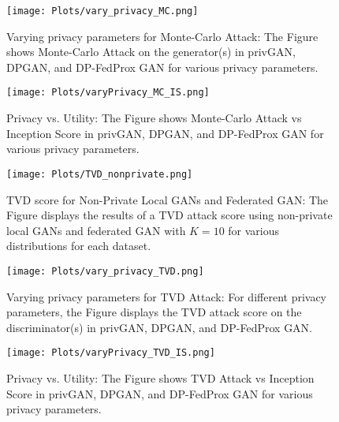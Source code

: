 \begin{figure}
 \centering
 \texttt{[image: Plots/vary\_privacy\_MC.png]}
 \caption{Varying privacy parameters for Monte-Carlo Attack: The Figure shows Monte-Carlo Attack on the generator(s) in privGAN, DPGAN, and DP-FedProx GAN for various privacy parameters. }
 \label{fig:vary_privacy_MC}
\end{figure}


\begin{figure}
 \centering
 \texttt{[image: Plots/varyPrivacy\_MC\_IS.png]}
 \caption{Privacy vs. Utility: The Figure shows Monte-Carlo Attack vs Inception Score in privGAN, DPGAN, and DP-FedProx GAN for various privacy parameters.}
 \label{fig:varyPrivacy_MC_IS}
\end{figure}

\begin{figure}
 \centering
 \texttt{[image: Plots/TVD\_nonprivate.png]}
 \caption{TVD score for Non-Private Local GANs and Federated GAN: The Figure displays the results of a TVD attack score using non-private local GANs and federated GAN with $K=10$ for various distributions for each dataset.}
 \label{fig:TVD_nonprivate}
\end{figure}


\begin{figure}
 \centering
 \texttt{[image: Plots/vary\_privacy\_TVD.png]}
 \caption{Varying privacy parameters for TVD Attack: For different privacy parameters, the Figure displays the TVD attack score on the discriminator(s) in privGAN, DPGAN, and DP-FedProx GAN.}
 \label{fig:vary_privacy_TVD}
\end{figure}



\begin{figure}
 \centering
 \texttt{[image: Plots/varyPrivacy\_TVD\_IS.png]}
 \caption{Privacy vs. Utility: The Figure shows TVD Attack vs Inception Score in privGAN, DPGAN, and DP-FedProx GAN for various privacy parameters.}
 \label{fig:varyPrivacy_MC_IS}
\end{figure}





